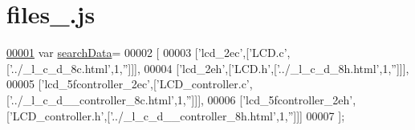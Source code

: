 \hypertarget{files__3_8js_source}{}\section{files\+\_.\+js}
\label{files__3_8js_source}

\begin{DoxyCode}
\hypertarget{files__3_8js_source.tex_l00001}{}\hyperlink{files__3_8js_ad01a7523f103d6242ef9b0451861231e}{00001} var \hyperlink{files__3_8js_ad01a7523f103d6242ef9b0451861231e}{searchData}=
00002 [
00003   [\textcolor{stringliteral}{'lcd\_2ec'},[\textcolor{stringliteral}{'LCD.c'},[\textcolor{stringliteral}{'../\_l\_c\_d\_8c.html'},1,\textcolor{stringliteral}{''}]]],
00004   [\textcolor{stringliteral}{'lcd\_2eh'},[\textcolor{stringliteral}{'LCD.h'},[\textcolor{stringliteral}{'../\_l\_c\_d\_8h.html'},1,\textcolor{stringliteral}{''}]]],
00005   [\textcolor{stringliteral}{'lcd\_5fcontroller\_2ec'},[\textcolor{stringliteral}{'LCD\_controller.c'},[\textcolor{stringliteral}{'../\_l\_c\_d\_\_controller\_8c.html'},1,\textcolor{stringliteral}{''}]]],
00006   [\textcolor{stringliteral}{'lcd\_5fcontroller\_2eh'},[\textcolor{stringliteral}{'LCD\_controller.h'},[\textcolor{stringliteral}{'../\_l\_c\_d\_\_controller\_8h.html'},1,\textcolor{stringliteral}{''}]]]
00007 ];
\end{DoxyCode}

